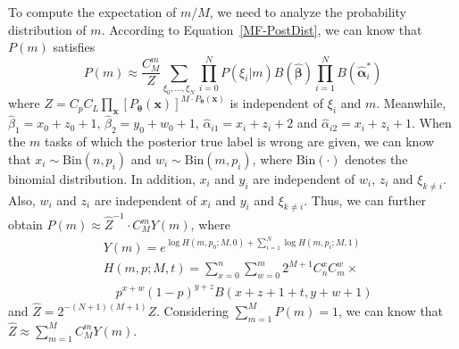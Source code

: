 \documentclass{article}
\begin{document}
To compute the expectation of $m/M$, we need to analyze the probability distribution of $m$. According to Equation~\ref{MF-PostDist}, we can know that $P(m)$ satisfies
\begin{equation}
P(m) \approx \frac{C_{M}^{m}}{Z} \sum_{\xi_0,\ldots, \xi_N}\prod_{i=0}^{N}P(\xi_i|m) B(\hat{\bm{\beta}})\prod_{i=1}^{N}B(\hat{\bm{\alpha}}^{*}_{i})
\end{equation}
where $Z=C_pC_L{\prod}_{\bm{x}} [P_{\bm{\theta}}(\bm{x})]^{M\cdot P_{\bm{\theta}}(\bm{x})}$ is independent of $\xi_i$ and $m$.
Meanwhile, $\hat{\beta}_1=x_0+z_0+1$, $\hat{\beta}_2=y_0+w_0+1$, $\hat{\alpha}_{i1}=x_i+z_i+2$ and $\hat{\alpha}_{i2}=x_i+z_i+1$.
When the $m$ tasks of which the posterior true label is wrong are given, we can know that $x_i\sim \mathrm{Bin}(n, p_i)$ and $w_i\sim \mathrm{Bin}(m, p_i)$, where $\mathrm{Bin}(\cdot)$ denotes the binomial distribution.
In addition, $x_i$ and $y_i$ are independent of $w_i$, $z_i$ and $\xi_{k\neq i}$.
Also, $w_i$ and $z_i$ are independent of $x_i$ and $y_i$ and $\xi_{k\neq i}$.
Thus, we can further obtain $P(m)\approx \hat{Z}^{-1}\cdot C_{M}^{m}Y(m)$, where
\begin{equation}
\label{PDist}
\begin{split}
&Y(m) =e^{\log H(m,p_0;M,0)+\sum_{i=1}^{N}\log H(m,p_i;M,1)}\\
&H(m,p;M,t)={\sum}_{x=0}^{n}{\sum}_{w=0}^{m} 2^{M+1}C_{n}^{x}C_{m}^{w}\times\\
&\quad p^{x+w}(1-p)^{y+z}B(x+z+1+t,y+w+1)
\end{split}
\end{equation}
and $\hat{Z}=2^{-(N+1)(M+1)}Z$.
Considering $\sum_{m=1}^{M} P(m)=1$, we can know that $\hat{Z}\approx{\sum}_{m=1}^{M}C_{M}^{m}Y(m)$.
\end{document}
